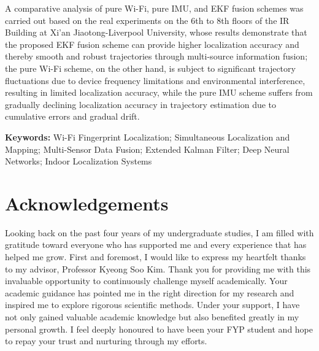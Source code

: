 \documentclass[12pt,a4paper]{article}
\numberwithin{equation}{section}
\begin{document}
A comparative analysis of pure Wi-Fi, pure IMU, and EKF fusion schemes was
carried out based on the real experiments on the 6th to 8th floors of the IR
Building at Xi'an Jiaotong-Liverpool University, whose results demonstrate that
the proposed EKF fusion scheme can provide higher localization accuracy and
thereby smooth and robust trajectories through multi-source information fusion;
the pure Wi-Fi scheme, on the other hand, is subject to significant trajectory
fluctuations due to device frequency limitations and environmental interference,
resulting in limited localization accuracy, while the pure IMU scheme suffers
from gradually declining localization accuracy in trajectory estimation due to
cumulative errors and gradual drift.

\vspace{0.5cm}%
\noindent%
\textbf{Keywords:} Wi-Fi Fingerprint Localization; Simultaneous Localization and
Mapping; Multi-Sensor Data Fusion; Extended Kalman Filter; Deep Neural Networks;
Indoor Localization Systems



\newpage
\section*{Acknowledgements}
 Looking back on the past four
years of my undergraduate studies, I am filled with gratitude toward everyone
who has supported me and every experience that has helped me grow. First and
foremost, I would like to express my heartfelt thanks to my advisor, Professor
Kyeong Soo Kim. Thank you for providing me with this invaluable opportunity to
continuously challenge myself academically. Your academic guidance has pointed
me in the right direction for my research and inspired me to explore rigorous
scientific methods. Under your support, I have not only gained valuable academic
knowledge but also benefited greatly in my personal growth. I feel deeply
honoured to have been your FYP student and hope to repay your trust and
nurturing through my efforts.
\end{document}
